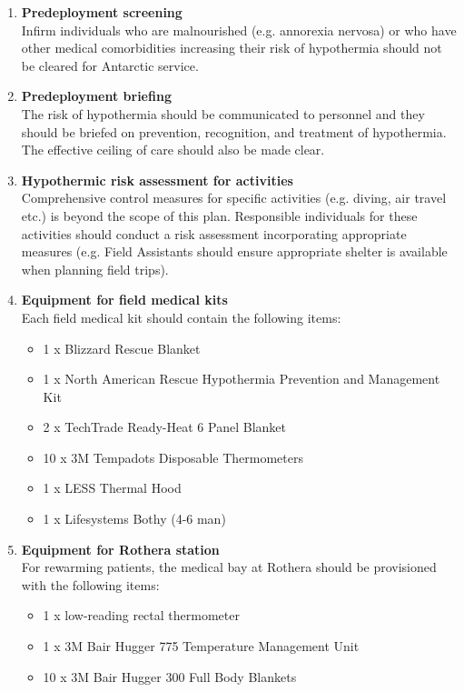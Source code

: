 \documentclass[12pt,a4paper]{article}
\begin{document}
\begin{enumerate}
    \item \textbf{Predeployment screening} \\
    Infirm individuals who are malnourished (e.g. annorexia nervosa) or who have other medical comorbidities increasing their risk of hypothermia should not be cleared for Antarctic service.
    \item \textbf{Predeployment briefing} \\
    The risk of hypothermia should be communicated to personnel and they should be briefed on prevention, recognition, and treatment of hypothermia. The effective ceiling of care should also be made clear.
    \item \textbf{Hypothermic risk assessment for activities} \\
    Comprehensive control measures for specific activities (e.g. diving, air travel etc.) is beyond the scope of this plan. Responsible individuals for these activities should conduct a risk assessment incorporating appropriate measures (e.g. Field Assistants should ensure appropriate shelter is available when planning field trips).
    \item \textbf{Equipment for field medical kits} \\
    Each field medical kit should contain the following items:
    \begin{itemize}
        \item 1 x  Blizzard Rescue Blanket
        \item 1 x North American Rescue Hypothermia Prevention and Management Kit
        \item 2 x TechTrade Ready-Heat 6 Panel Blanket
        \item 10 x 3M Tempadots Disposable Thermometers
        \item 1 x LESS Thermal Hood
        \item 1 x Lifesystems Bothy (4-6 man)
    \end{itemize}
    \item \textbf{Equipment for Rothera station} \\
    For rewarming patients, the medical bay at Rothera should be provisioned with the following items:
    \begin{itemize}
        \item 1 x  low-reading rectal thermometer
        \item 1 x 3M Bair Hugger 775 Temperature Management Unit
        \item 10 x 3M Bair Hugger 300 Full Body Blankets

\end{itemize}
\end{enumerate}
\end{document}
